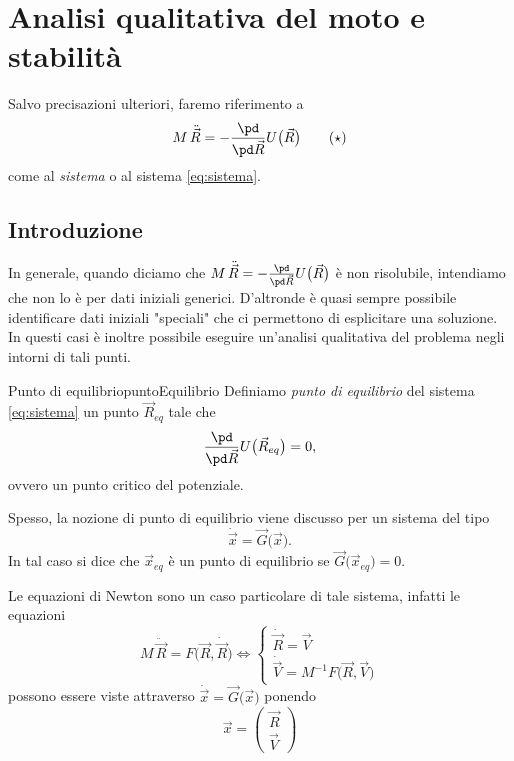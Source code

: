 %
%
\chapter{Analisi qualitativa del moto e stabilità}

Salvo precisazioni ulteriori, faremo riferimento a
\[\label{eq:sistema}
	M\,\ddot{\vec{R}} = -\frac{\pd}{\pd\vec{R}}U\big(\vec{R}\big)\tag{\(\star\)}
\]
come al \emph{sistema} o al sistema \eqref{eq:sistema}.
\section{Introduzione}

In generale, quando diciamo che \(M\,\ddot{\vec{R}} = -\frac{\pd}{\pd\vec{R}}U\big(\vec{R}\big)\) è non risolubile, intendiamo che non lo è per dati iniziali generici.
D'altronde è quasi sempre possibile identificare dati iniziali "speciali" che ci permettono di esplicitare una soluzione. In questi casi è inoltre possibile eseguire un'analisi qualitativa del problema negli intorni di tali punti.

\begin{defn}{Punto di equilibrio}{puntoEquilibrio}
	Definiamo \emph{punto di equilibrio} del sistema \eqref{eq:sistema} un punto \(\vec{R}_{eq}\) tale che
	\[
		\frac{\pd}{\pd\vec{R}}U\big(\vec{R}_{eq}\big) = 0,
	\]
	ovvero un punto critico del potenziale.
\end{defn}

\begin{oss}
	Spesso, la nozione di punto di equilibrio viene discusso per un sistema del tipo
	\[
		\dot{\vec{x}} = \vec{G}\big(\vec{x}\big).
	\]
	In tal caso si dice che \(\vec{x}_{eq}\) è un punto di equilibrio se \(\vec{G}\big(\vec{x}_{eq}\big)=0\).
	
	Le equazioni di Newton sono un caso particolare di tale sistema, infatti le equazioni
	\[
		M\,\ddot{\vec{R}} = F\big(\vec{R},\dot{\vec{R}}\big) \iff
		\begin{cases}
			\dot{\vec{R}} = \vec{V} \\
			\dot{\vec{V}} = M^{-1}F\big(\vec{R},\vec{V}\big)
		\end{cases}
	\]
	possono essere viste attraverso \(\dot{\vec{x}}=\vec{G}\big(\vec{x}\big)\) ponendo
	\[
		\vec{x} = \begin{pmatrix}\vec{R}\\\vec{V}\end{pmatrix}
	\]
\end{oss}

